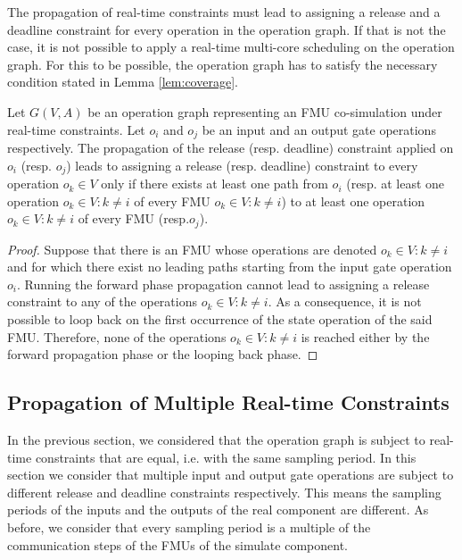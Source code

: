The propagation of real-time constraints must lead to assigning a release and a deadline constraint for every operation in the operation graph. If that is not the case, it is not possible to apply a real-time multi-core scheduling on the operation graph. For this to be possible, the operation graph has to satisfy the necessary condition stated in Lemma \ref{lem:coverage}.

\begin{lemma}
Let $G(V,A)$ be an operation graph representing an FMU co-simulation under real-time constraints. Let $o_i$ and $o_j$ be an input and an output gate operations respectively. The propagation of the release (resp. deadline) constraint applied on $o_i$ (resp. $o_j$) leads to assigning a release (resp. deadline) constraint to every operation $o_k \in V$ only if there exists at least one path from $o_i$ (resp. at least one operation $o_k \in  V : k \neq i$ of every FMU $o_k \in  V : k \neq i$) to at least one operation $o_k \in  V : k \neq i$ of every FMU (resp.$o_j$).  
\label{lem:coverage}
\end{lemma}

\begin{proof}
Suppose that there is an FMU whose operations are denoted $o_k \in  V : k \neq i$ and for which there exist no leading paths starting from the input gate operation $o_i$. Running the forward phase propagation cannot lead to assigning a release constraint to any of the operations $o_k \in  V : k \neq i$. As a consequence, it is not possible to loop back on the first occurrence of the state operation of the said FMU. Therefore, none of the operations $o_k \in  V : k \neq i$ is reached either by the forward propagation phase or the looping back phase.      
\end{proof}

\subsection{Propagation of Multiple Real-time Constraints}

In the previous section, we considered that the operation graph is subject to real-time constraints that are equal, i.e. with the same sampling period. In this section we consider that multiple input and output gate operations are subject to different release and deadline constraints respectively. This means the sampling periods of the inputs and the outputs of the real component are different. As before, we consider that every sampling period is a multiple of the communication steps of the FMUs of the simulate component.

